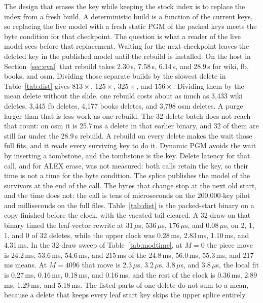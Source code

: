 \documentclass[conference]{IEEEtran}
\begin{document}
The design that erases the key while keeping the stock index is to replace the index from a fresh build.
A deterministic build is a function of the current keys, so replacing the live model with a fresh static PGM of the packed keys meets the byte condition for that checkpoint.
The question is what a reader of the live model sees before that replacement.
Waiting for the next checkpoint leaves the deleted key in the published model until the rebuild is installed.
On the host in Section~\ref{sec:eval} that rebuild takes 2.30\,s, 7.58\,s, 6.14\,s, and 28.9\,s for wiki, fb, books, and osm.
Dividing those separate builds by the slowest delete in Table~\ref{tab:dist} gives $813\times$, $125\times$, $325\times$, and $156\times$.
Dividing them by the mean delete without the slide, one rebuild costs about as much as 3{,}433 wiki deletes, 3{,}445 fb deletes, 4{,}177 books deletes, and 3{,}798 osm deletes.
A purge larger than that is less work as one rebuild.
The 32-delete batch does not reach that count: on osm it is 25.7\,ms a delete in that earlier binary, and 32 of them are still far under the 28.9\,s rebuild.
A rebuild on every delete makes the wait those full fits, and it reads every surviving key to do it.
Dynamic PGM avoids the wait by inserting a tombstone, and the tombstone is the key.
Delete latency for that call, and for ALEX erase, was not measured: both calls retain the key, so their time is not a time for the byte condition.
The splice publishes the model of the survivors at the end of the call.
The bytes that change stop at the next old start, and the time does not: the call is tens of microseconds on the 200{,}000-key pilot and milliseconds on the full files.
Table~\ref{tab:dist} is the packed-start binary on a copy finished before the clock, with the vacated tail cleared.
A 32-draw on that binary timed the leaf-vector rewrite at 31\,$\mu$s, 536\,$\mu$s, 176\,$\mu$s, and 0.08\,$\mu$s, on 2, 1, 1, and 0 of 32 deletes, while the upper clock was 0.28\,ms, 2.83\,ms, 1.10\,ms, and 4.31\,ms.
In the 32-draw sweep of Table~\ref{tab:modtime}, at $M=0$ the piece move is 24.2\,ms, 53.6\,ms, 54.6\,ms, and 215\,ms of the 24.8\,ms, 56.0\,ms, 55.3\,ms, and 217\,ms means.
At $M=4096$ that move is 2.3\,$\mu$s, 3.2\,$\mu$s, 3.8\,$\mu$s, and 3.8\,$\mu$s, the local fit is 0.27\,ms, 0.16\,ms, 0.18\,ms, and 0.16\,ms, and the rest of the clock is 0.36\,ms, 2.89\,ms, 1.29\,ms, and 5.18\,ms.
The listed parts of one delete do not sum to a mean, because a delete that keeps every leaf start key skips the upper splice entirely.
\end{document}
